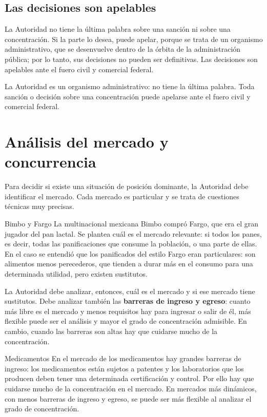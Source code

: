 \documentclass[12pt,oneside]{book}
\begin{document}
\subsection{Las decisiones son apelables}

La Autoridad no tiene la última palabra sobre una sanción ni sobre una concentración. Si la parte lo desea, puede apelar, porque se trata de un organismo administrativo, que se desenvuelve dentro de la órbita de la administración pública; por lo tanto, sus decisiones no pueden ser definitivas. Las decisiones son apelables ante el fuero civil y comercial federal.

\begin{important}
La Autoridad es un organismo administrativo: no tiene la última palabra. Toda sanción o decisión sobre una concentración puede apelarse ante el fuero civil y comercial federal.
\end{important}

\section{Análisis del mercado y concurrencia}

Para decidir si existe una situación de posición dominante, la Autoridad debe identificar el mercado. Cada mercado es particular y se trata de cuestiones técnicas muy precisas.

\begin{example}{Bimbo y Fargo}
La multinacional mexicana Bimbo compró Fargo, que era el gran jugador del pan lactal. Se plantea cuál es el mercado relevante: si todos los panes, es decir, todas las panificaciones que consume la población, o una parte de ellas. En el caso se entendió que los panificados del estilo Fargo eran particulares: son alimentos menos perecederos, que tienden a durar más en el consumo para una determinada utilidad, pero existen sustitutos.
\end{example}

La Autoridad debe analizar, entonces, cuál es el mercado y si ese mercado tiene sustitutos. Debe analizar también las \textbf{barreras de ingreso y egreso}: cuanto más libre es el mercado y menos requisitos hay para ingresar o salir de él, más flexible puede ser el análisis y mayor el grado de concentración admisible. En cambio, cuando las barreras son altas hay que cuidarse mucho de la concentración.

\begin{example}{Medicamentos}
En el mercado de los medicamentos hay grandes barreras de ingreso: los medicamentos están sujetos a patentes y los laboratorios que los producen deben tener una determinada certificación y control. Por ello hay que cuidarse mucho de la concentración en el mercado. En mercados más dinámicos, con menos barreras de ingreso y egreso, se puede ser más flexible al analizar el grado de concentración.
\end{example}
\end{document}
